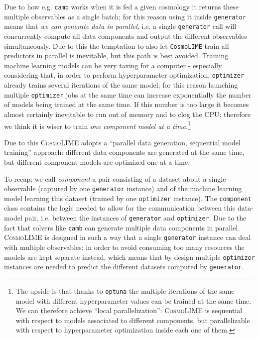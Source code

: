 Due to how e.g. \texttt{camb} works when it is fed a given cosmology it returns these multiple observables as a single batch; for this reason using it inside \texttt{generator} means that \emph{we can generate data in parallel}, i.e. a single \texttt{generator} call will concurrently compute all data components and output the different observables simultaneously.
Due to this the temptation to also let \texttt{CosmoLIME} train all predictors in parallel is inevitable, but this path is best avoided. Training machine learning models can be very taxing for a computer - especially considering that, in order to perform hyperparameter optimization, \texttt{optimizer} already trains several iterations of the same model; for this reason launching multiple \texttt{optimizer} jobs at the same time can increase exponentially the number of models being trained at the same time. If this number is too large it becomes almost certainly inevitable to run out of memory and to clog the CPU; therefore we think it is wiser to train \emph{one component model at a time}.\footnote{The upside is that thanks to \texttt{optuna} the multiple iterations of the same model with different hyperparameter values can be trained at the same time. We can therefore achieve ``local parallelization'': \textsc{CosmoLIME} is sequential with respect to models associated to different components, but parallelizable with respect to hyperparameter optimization inside each one of them.}

Due to this \textsc{CosmoLIME} adopts a ``parallel data generation, sequential model training'' approach: different data components are generated at the same time, but different component models are optimized one at a time.

To recap: we call \emph{component} a pair consisting of a dataset about a single observable (captured by one \texttt{generator} instance) and of the machine learning model learning this dataset (trained by one \texttt{optimizer} instance). The \texttt{component} class contains the logic needed to allow for the communication between this data-model pair, i.e. between the instances of \texttt{generator} and \texttt{optimizer}. Due to the fact that solvers like \texttt{camb} can generate multiple data components in parallel \textsc{CosmoLIME} is designed in such a way that a single \texttt{generator} instance can deal with multiple observables; in order to avoid consuming too many resources the models are kept separate instead, which means that by design multiple \texttt{optimizer} instances are needed to predict the different datasets computed by \texttt{generator}. 

